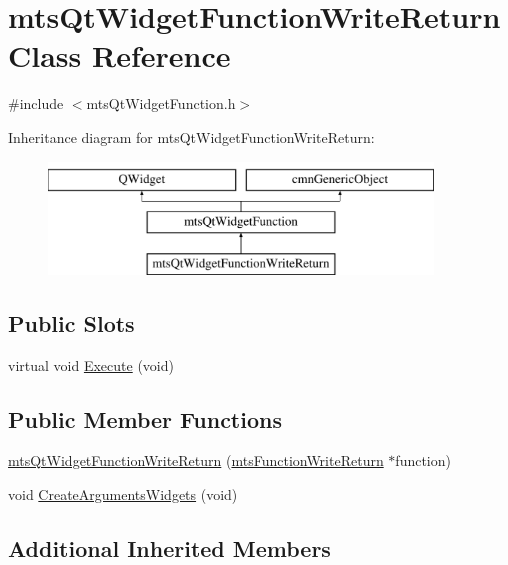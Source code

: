 \hypertarget{classmts_qt_widget_function_write_return}{}\section{mts\+Qt\+Widget\+Function\+Write\+Return Class Reference}
\label{classmts_qt_widget_function_write_return}


{\ttfamily \#include $<$mts\+Qt\+Widget\+Function.\+h$>$}

Inheritance diagram for mts\+Qt\+Widget\+Function\+Write\+Return\+:\begin{figure}[H]
\begin{center}
\leavevmode
\includegraphics[height=3.000000cm]{da/d15/classmts_qt_widget_function_write_return}
\end{center}
\end{figure}
\subsection*{Public Slots}
\begin{DoxyCompactItemize}
\item 
virtual void \hyperlink{classmts_qt_widget_function_write_return_a8997a2fa074deef7836eca372dcd25fe}{Execute} (void)
\end{DoxyCompactItemize}
\subsection*{Public Member Functions}
\begin{DoxyCompactItemize}
\item 
\hyperlink{classmts_qt_widget_function_write_return_aa9699fc306e29b8cdde7cfbc9b04e357}{mts\+Qt\+Widget\+Function\+Write\+Return} (\hyperlink{classmts_function_write_return}{mts\+Function\+Write\+Return} $\ast$function)
\item 
void \hyperlink{classmts_qt_widget_function_write_return_a4587f7f8daf16a597533fb7cfddfbbaa}{Create\+Arguments\+Widgets} (void)
\end{DoxyCompactItemize}
\subsection*{Additional Inherited Members}



